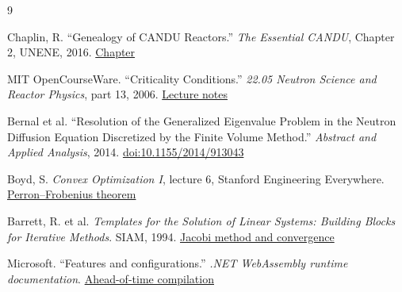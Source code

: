 \documentclass[11pt,letterpaper]{article}
\begin{document}
\begin{thebibliography}{9}

Chaplin, R. ``Genealogy of CANDU Reactors.'' \emph{The Essential CANDU}, Chapter 2,
UNENE, 2016.
\href{https://www.unene.ca/essentialcandu/pdf/2\%20-\%20Genealogy\%20of\%20CANDU\%20Reactors.pdf}{Chapter}

MIT OpenCourseWare. ``Criticality Conditions.'' \emph{22.05 Neutron Science and Reactor
Physics}, part 13, 2006.
\href{https://dspace.mit.edu/bitstream/handle/1721.1/74136/22-05-fall-2006/contents/lecture-notes/lecture13.pdf}{Lecture
notes}

Bernal et al. ``Resolution of the Generalized Eigenvalue Problem in the Neutron
Diffusion Equation Discretized by the Finite Volume Method.'' \emph{Abstract and Applied
Analysis}, 2014. \href{https://doi.org/10.1155/2014/913043}{doi:10.1155/2014/913043}

Boyd, S. \emph{Convex Optimization I}, lecture 6, Stanford Engineering Everywhere.
\href{https://see.stanford.edu/materials/lsocoee364a/transcripts/ConvexOptimizationI-Lecture06.html}{Perron--Frobenius
theorem}

Barrett, R. et al. \emph{Templates for the Solution of Linear Systems: Building Blocks
for Iterative Methods}. SIAM, 1994.
\href{https://www.netlib.org/templates/templates.html}{Jacobi method and convergence}

Microsoft. ``Features and configurations.'' \emph{.NET WebAssembly runtime
documentation}.
\href{https://github.com/dotnet/runtime/blob/main/src/mono/wasm/features.md\#aot}{Ahead-of-time
compilation}

\end{thebibliography}
\end{document}
